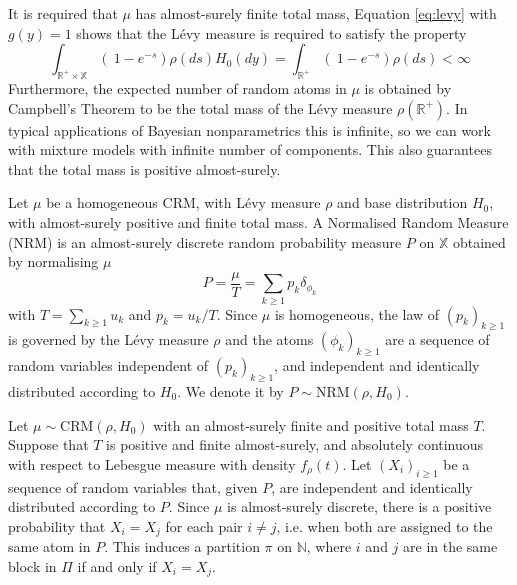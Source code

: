 It is required that $\mu$ has almost-surely finite total mass, Equation \ref{eq:levy} with $g(y)=1$ shows that the Lévy measure is required to satisfy the property
$$ \int_{\mathbb{R}^+ \times \mathbb{X}} \left( \  1 - e^{-s} \right) \rho(ds) H_0(dy) = 
\int_{\mathbb{R}^+} \left( \  1 - e^{-s} \right) \rho(ds) < \infty $$
Furthermore, the expected number of random atoms in $\mu$ is obtained by Campbell’s Theorem to be the total mass of the Lévy measure $\rho(\mathbb{R}^+)$. In typical applications of Bayesian nonparametrics this is infinite, so we can work with mixture models with infinite number of components. This also guarantees that the total mass is positive almost-surely. \\

\begin{definition} \label{def:NRM}
Let $\mu$ be a homogeneous \gls{CRM}, with Lévy measure $\rho$ and base distribution $H_0$, with almost-surely positive and finite total mass. A Normalised Random Measure (NRM) is an almost-surely discrete random probability measure $P$ on $\mathbb{X}$ obtained by normalising $\mu$
$$ P = \frac{\mu}{T} = \sum_{k \ge 1}{p_k \delta_{\phi_k}} $$
with $T = \sum_{k \ge 1}{u_k}$ and $p_k = u_k / T$.
Since $\mu$ is homogeneous, the law of $\left(p_k \right)_{k \ge 1}$ is governed by the Lévy measure $\rho$ and the atoms $\left(\phi_k \right)_{k \ge 1}$ are a sequence of random variables independent of $\left(p_k \right)_{k \ge 1}$, and independent and identically distributed according to $H_0$.
We denote it by $P \sim \text{NRM}(\rho, H_0)$. \\
\end{definition}

Let $\mu \sim \text{CRM}(\rho, H_0)$ with an almost-surely finite and positive total mass $T$. Suppose that $T$ is positive and finite almost-surely, and absolutely continuous with respect to Lebesgue measure with density $f_\rho(t)$.
Let $(X_i)_{i \ge 1}$ be a sequence of random variables that, given $P$, are independent and identically distributed according to $P$. Since $\mu$ is almost-surely discrete, there is a positive probability that $X_i = X_j$ for each pair $i \neq j$, i.e. when both are assigned to the same atom in $P$. This induces a partition $\pi$ on $\mathbb{N}$, where $i$ and $j$ are in the same block in $\Pi$ if and only if $X_i = X_j$. %

